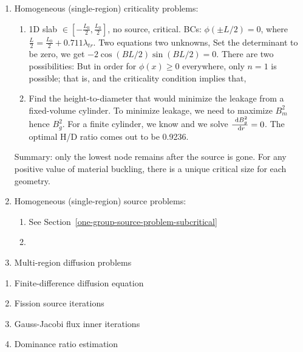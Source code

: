 \documentclass{school-22.211-notes}
\begin{document}
\clearpage
{}
\begin{enumerate}
\item Homogeneous (single-region) criticality problems:
  \begin{enumerate}
  \item 1D slab $\in  \left[- \frac{L_0}{2}, \frac{L_0}{2} \right]$, no source, critical. 
    BCs: $\phi(\pm L/2) = 0$, where $\frac{L}{2} = \frac{L_0}{2} + 0.711 \lambda_{tr}$. Two equations two unknowns, 
    Set the determinant to be zero, we get $-2 \cos (BL/2) \sin (BL/2) = 0$. There are two possibilities: 
    But in order for $\phi(x) \ge 0$ everywhere, only $n=1$ is possible; that is, 
    and the criticality condition implies that, 

  \item Find the height-to-diameter that would minimize the leakage from a fixed-volume cylinder. To minimize leakage, we need to maximize $B_m^2$ hence $B_g^2$. For a finite cylinder, we know
    and we solve $\frac{\mbox{ }\mathrm{d} B_g^2}{\mbox{ }\mathrm{d} r} = 0$. The optimal H/D ratio comes out to be 0.9236. 
    
  \end{enumerate}
  Summary: only the lowest node remains after the source is gone. For any positive value of material buckling, there is a unique critical size for each geometry. 
  
\item Homogeneous (single-region) source problems:
  \begin{enumerate}
  \item See Section~\ref{one-group-source-problem-subcritical}
  \item 
  \end{enumerate}
  
\item Multi-region diffusion problems
\end{enumerate}

\clearpage
{}
\begin{enumerate}
\item Finite-difference diffusion equation
\item Fission source iterations
\item Gauss-Jacobi flux inner iterations
\item Dominance ratio estimation
\end{enumerate}
\end{document}
